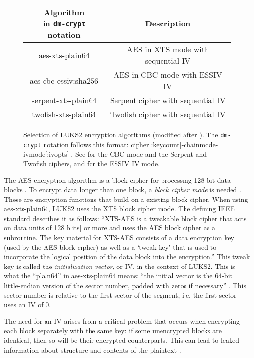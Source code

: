 \begin{figure}[htb!]
	\center
	\begin{tabular}{cc}
		\makecell{\textbf{Algorithm}\\in \texttt{dm-crypt} notation} & \textbf{Description} \\
		\hline
		aes-xts-plain64 & AES in XTS mode with sequential IV \\
		aes-cbc-essiv:sha256 & AES in CBC mode with ESSIV IV \\
		serpent-xts-plain64 & Serpent cipher with sequential IV \\
		twofish-xts-plain64 & Twofish cipher with sequential IV
	\end{tabular}
	\caption[
		Selection of LUKS2 encryption algorithms
	]{
		Selection of LUKS2 encryption algorithms (modified after \cite{Broz2018}). The \texttt{dm-crypt} notation follows this format: cipher[:keycount]-chainmode-ivmode[:ivopts] \cite{Dmcrypt2020}. See \cite{Ferguson2010} for the CBC mode and the Serpent and Twofish ciphers, and \cite{Fruhwirth2005} for the ESSIV IV mode.
	}
	\label{fig:background.luks2.encryptionalgorithms}
\end{figure}

The AES encryption algorithm is a block cipher for processing 128 bit data blocks \cite{Fips197}. To encrypt data longer than one block, a \emph{block cipher mode} is needed \cite{Ferguson2010}. These are encryption functions that build on a existing block cipher. When using aes-xts-plain64, LUKS2 uses the XTS block cipher mode. The defining IEEE standard \cite{Ieee2019} describes it as follows: ``XTS-AES is a tweakable block cipher that acts on data units of 128 b[its] or more and uses the AES block cipher as a subroutine. The key material for XTS-AES consists of a data encryption key (used by the AES block cipher) as well as a `tweak key' that is used to incorporate the logical position of the data block into the encryption.'' This tweak key is called the \emph{initialization vector}, or IV, in the context of LUKS2. This is what the ``plain64'' in aes-xts-plain64 means: ``the initial vector is the 64-bit little-endian version of the sector number, padded with zeros if necessary'' \cite{Dmcrypt2020}. This sector number is relative to the first sector of the segment, i.e. the first sector uses an IV of 0.

The need for an IV arises from a critical problem that occurs when encrypting each block separately with the same key: if some unencrypted blocks are identical, then so will be their encrypted counterparts. This can lead to leaked information about structure and contents of the plaintext \cite{Ferguson2010}.

